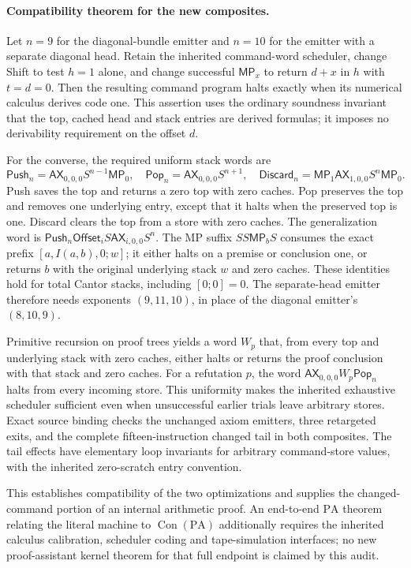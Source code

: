 \paragraph{Compatibility theorem for the new composites.}
Let $n=9$ for the diagonal-bundle emitter and $n=10$ for the emitter
with a separate diagonal head. Retain the inherited command-word
scheduler, change Shift to test $h=1$ alone, and change successful
$\mathsf{MP}_x$ to return $d+x$ in $h$ with $t=d=0$.
Then the resulting command program halts exactly when its numerical
calculus derives code one. This assertion uses the ordinary soundness
invariant that the top, cached head and stack entries are derived
formulas; it imposes no derivability requirement on the offset $d$.

For the converse, the required uniform stack words are
\[
\mathsf{Push}_n=\mathsf{AX}_{0,0,0}S^{n-1}\mathsf{MP}_0,
\quad
\mathsf{Pop}_n=\mathsf{AX}_{0,0,0}S^{n+1},
\quad
\mathsf{Discard}_n=\mathsf{MP}_1\mathsf{AX}_{1,0,0}S^n\mathsf{MP}_0.
\]
Push saves the top and returns a zero top with zero caches. Pop
preserves the top and removes one underlying entry, except that it
halts when the preserved top is one. Discard clears the top from a
store with zero caches. The generalization word is
$\mathsf{Push}_n\mathsf{Offset}_iS\mathsf{AX}_{i,0,0}S^n$.
The MP suffix $SS\mathsf{MP}_bS$ consumes the exact prefix
$[a,I(a,b),0;w]$; it either halts on a premise or conclusion one, or
returns $b$ with the original underlying stack $w$ and zero caches.
These identities hold for total Cantor stacks, including $[0;0]=0$.
The separate-head emitter therefore needs exponents $(9,11,10)$,
in place of the diagonal emitter's $(8,10,9)$.

Primitive recursion on proof trees yields a word $W_p$ that, from
every top and underlying stack with zero caches, either halts or
returns the proof conclusion with that stack and zero caches.
For a refutation $p$, the word
$\mathsf{AX}_{0,0,0}W_p\mathsf{Pop}_n$ halts from every incoming
store. This uniformity makes the inherited exhaustive scheduler
sufficient even when unsuccessful earlier trials leave arbitrary
stores. Exact source binding checks the unchanged axiom emitters,
three retargeted exits, and the complete fifteen-instruction changed
tail in both composites. The tail effects have elementary loop
invariants for arbitrary command-store values, with the inherited
zero-scratch entry convention.

This establishes compatibility of the two optimizations and supplies
the changed-command portion of an internal arithmetic proof.
An end-to-end $\mathrm{PA}$ theorem relating the literal machine to
$\operatorname{Con}(\mathrm{PA})$ additionally requires the inherited
calculus calibration, scheduler coding and tape-simulation interfaces;
no new proof-assistant kernel theorem for that full endpoint is
claimed by this audit.
